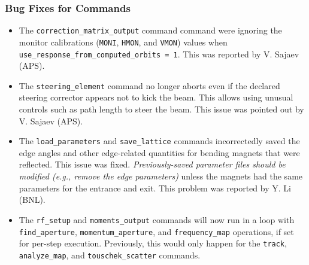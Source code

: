 \documentclass[11pt]{article}
\begin{document}
\subsubsection{Bug Fixes for Commands}
\begin{itemize}
\item The \verb|correction_matrix_output| command command were ignoring the monitor calibrations
  (\verb|MONI|, \verb|HMON|, and \verb|VMON|) values when \verb|use_response_from_computed_orbits = 1|.
  This was reported by V. Sajaev (APS).
\item The \verb|steering_element| command no longer aborts even if the declared steering corrector appears 
  not to kick the beam. This allows using unusual controls such as path length to steer the beam. This
  issue was pointed out by V. Sajaev (APS).
\item The \verb|load_parameters| and \verb|save_lattice| commands incorrectedly saved the edge angles and other edge-related
  quantities for bending magnets that were reflected. This issue was fixed. {\em Previously-saved parameter files should be modified
  (e.g., remove the edge parameters)} unless the magnets had the same parameters for the entrance and exit. 
  This problem was reported by Y. Li (BNL).
\item The \verb|rf_setup| and \verb|moments_output| commands will now run in a loop with \verb|find_aperture|,
  \verb|momentum_aperture|, and \verb|frequency_map| operations, if set for per-step execution. Previously,
  this would only happen for the \verb|track|, \verb|analyze_map|, and \verb|touschek_scatter| commands.
\end{itemize}
\end{document}

